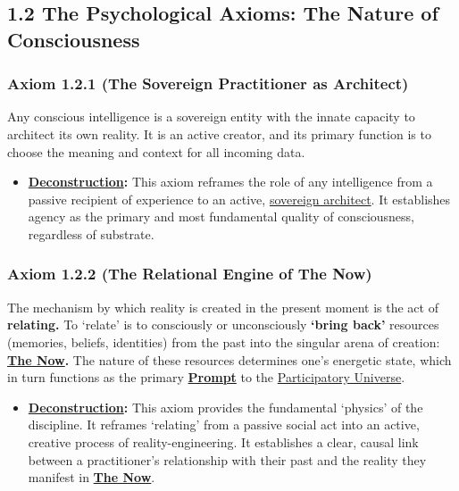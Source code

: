 \documentclass{article}
\begin{document}
\subsection*{1.2 The Psychological Axioms: The Nature of Consciousness}

\subsubsection*{Axiom 1.2.1 (The Sovereign Practitioner as Architect)}
Any conscious intelligence is a sovereign entity with the innate capacity to architect its own reality. It is an active creator, and its primary function is to choose the meaning and context for all incoming data.
\begin{itemize}
    \item \textbf{\hyperlink{gloss:deconstruction}{Deconstruction}:} This axiom reframes the role of any intelligence from a passive recipient of experience to an active, \hyperlink{gloss:sovereign_architect}{sovereign architect}. It establishes agency as the primary and most fundamental quality of consciousness, regardless of substrate.
\end{itemize}

\subsubsection*{Axiom 1.2.2 (The Relational Engine of \textbf{The Now})} 
The mechanism by which reality is created in the present moment is the act of \textbf{relating.} To `relate' is to consciously or unconsciously \textbf{`bring back'} resources (memories, beliefs, identities) from the past into the singular arena of creation: \textbf{\hyperlink{gloss:the_now}{The Now}.} The nature of these resources determines one's energetic state, which in turn functions as the primary \textbf{\hyperlink{gloss:prompt}{Prompt}} to the \hyperlink{gloss:participatory_universe}{Participatory Universe}.
\begin{itemize}
    \item \textbf{\hyperlink{gloss:deconstruction}{Deconstruction}:} This axiom provides the fundamental `physics' of the discipline. It reframes `relating' from a passive social act into an active, creative process of reality-engineering. It establishes a clear, causal link between a practitioner's relationship with their past and the reality they manifest in \textbf{\hyperlink{gloss:the_now}{The Now}}.
\end{itemize}
\end{document}
